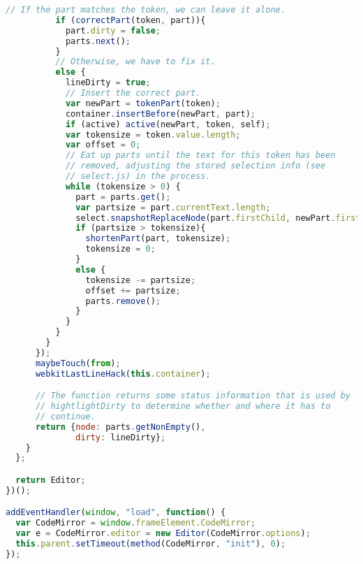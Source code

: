 \begin{lstlisting}[language=Javascript]
          // If the part matches the token, we can leave it alone.
          if (correctPart(token, part)){
            part.dirty = false;
            parts.next();
          }
          // Otherwise, we have to fix it.
          else {
            lineDirty = true;
            // Insert the correct part.
            var newPart = tokenPart(token);
            container.insertBefore(newPart, part);
            if (active) active(newPart, token, self);
            var tokensize = token.value.length;
            var offset = 0;
            // Eat up parts until the text for this token has been
            // removed, adjusting the stored selection info (see
            // select.js) in the process.
            while (tokensize > 0) {
              part = parts.get();
              var partsize = part.currentText.length;
              select.snapshotReplaceNode(part.firstChild, newPart.firstChild, tokensize, offset);
              if (partsize > tokensize){
                shortenPart(part, tokensize);
                tokensize = 0;
              }
              else {
                tokensize -= partsize;
                offset += partsize;
                parts.remove();
              }
            }
          }
        }
      });
      maybeTouch(from);
      webkitLastLineHack(this.container);

      // The function returns some status information that is used by
      // hightlightDirty to determine whether and where it has to
      // continue.
      return {node: parts.getNonEmpty(),
              dirty: lineDirty};
    }
  };

  return Editor;
})();

addEventHandler(window, "load", function() {
  var CodeMirror = window.frameElement.CodeMirror;
  var e = CodeMirror.editor = new Editor(CodeMirror.options);
  this.parent.setTimeout(method(CodeMirror, "init"), 0);
});
\end{lstlisting}

